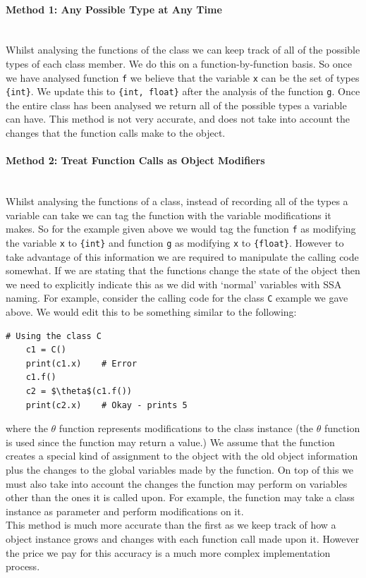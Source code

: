 \documentclass[12pt, titlepage]{article}
\begin{document}
\paragraph{Method 1: Any Possible Type at Any Time}\mbox{}\\
Whilst analysing the functions of the class we can keep track of all of the possible types of each class member. We do this on a function-by-function basis. So once we have analysed function \texttt{f} we believe that the variable \texttt{x} can be the set of types \texttt{\{int\}}. We update this to \texttt{\{int, float\}} after the analysis of the function \texttt{g}. Once the entire class has been analysed we return all of the possible types a variable can have. This method is not very accurate, and does not take into account the changes that the function calls make to the object.

\paragraph{Method 2: Treat Function Calls as Object Modifiers}\mbox{}\\
Whilst analysing the functions of a class, instead of recording all of the types a variable can take we can tag the function with the variable modifications it makes. So for the example given above we would tag the function \texttt{f} as modifying the variable \texttt{x} to \texttt{\{int\}} and function \texttt{g} as modifying \texttt{x} to \texttt{\{float\}}. However to take advantage of this information we are required to manipulate the calling code somewhat. If we are stating that the functions change the state of the object then we need to explicitly indicate this as we did with `normal' variables with SSA naming. For example, consider the calling code for the class \texttt{C} example we gave above. We would edit this to be something similar to the following:
\begin{lstlisting}[mathescape]
    # Using the class C
    c1 = C()
    print(c1.x)    # Error
    c1.f()
    c2 = $\theta$(c1.f())
    print(c2.x)    # Okay - prints 5
\end{lstlisting}
where the $\theta$ function represents modifications to the class instance (the $\theta$ function is used since the function may return a value.) We assume that the function creates a special kind of assignment to the object with the old object information plus the changes to the global variables made by the function. On top of this we must also take into account the changes the function may perform on variables other than the ones it is called upon. For example, the function may take a class instance as parameter and perform modifications on it. \\
\indent This method is much more accurate than the first as we keep track of how a object instance grows and changes with each function call made upon it. However the price we pay for this accuracy is a much more complex implementation process.
\end{document}

